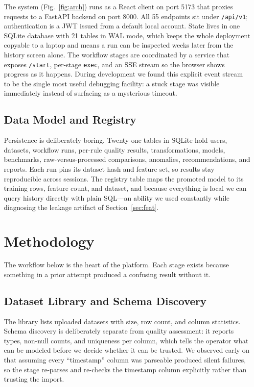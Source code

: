 \documentclass[conference]{IEEEtran}
\begin{document}
The system (Fig.~\ref{fig:arch}) runs as a React client on port 5173 that proxies requests to a FastAPI backend on port 8000. All 55 endpoints sit under \texttt{/api/v1}; authentication is a JWT issued from a default local account. State lives in one SQLite database with 21 tables in WAL mode, which keeps the whole deployment copyable to a laptop and means a run can be inspected weeks later from the history screen alone. The workflow stages are coordinated by a service that exposes \texttt{/start}, per-stage \texttt{exec}, and an SSE stream so the browser shows progress as it happens. During development we found this explicit event stream to be the single most useful debugging facility: a stuck stage was visible immediately instead of surfacing as a mysterious timeout.

\subsection{Data Model and Registry}

Persistence is deliberately boring. Twenty-one tables in SQLite hold users, datasets, workflow runs, per-rule quality results, transformations, models, benchmarks, raw-versus-processed comparisons, anomalies, recommendations, and reports. Each run pins its dataset hash and feature set, so results stay reproducible across sessions. The registry table maps the promoted model to its training rows, feature count, and dataset, and because everything is local we can query history directly with plain SQL---an ability we used constantly while diagnosing the leakage artifact of Section~\ref{sec:feat}.

\section{Methodology}

The workflow below is the heart of the platform. Each stage exists because something in a prior attempt produced a confusing result without it.

\subsection{Dataset Library and Schema Discovery}

The library lists uploaded datasets with size, row count, and column statistics. Schema discovery is deliberately separate from quality assessment: it reports types, non-null counts, and uniqueness per column, which tells the operator what can be modeled before we decide whether it can be trusted. We observed early on that assuming every ``timestamp'' column was parseable produced silent failures, so the stage re-parses and re-checks the timestamp column explicitly rather than trusting the import.
\end{document}
